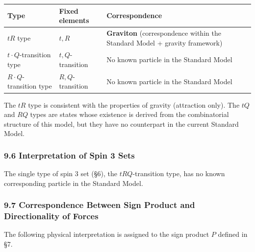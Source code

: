 \documentclass[
  a4paper,11pt]{article}
\newcounter{none}
\theoremstyle{definition}
\theoremstyle{remark}
\begin{document}
{\def\LTcaptype{none} %
\begin{longtable}[]{@{}
  >{\raggedright\arraybackslash}p{}
  >{\raggedright\arraybackslash}p{}
  >{\raggedright\arraybackslash}p{}@{}}
\toprule\noalign{}
\begin{minipage}[b]{\linewidth}\raggedright
Type
\end{minipage} & \begin{minipage}[b]{\linewidth}\raggedright
Fixed elements
\end{minipage} & \begin{minipage}[b]{\linewidth}\raggedright
Correspondence
\end{minipage} \\
\midrule\noalign{}
\endhead
\bottomrule\noalign{}
\endlastfoot
\(tR\) type & \(t, R\) & \textbf{Graviton} (correspondence within the
Standard Model + gravity framework) \\
\(t \cdot Q\)-transition type & \(t, Q\)-transition & No known particle
in the Standard Model \\
\(R \cdot Q\)-transition type & \(R, Q\)-transition & No known particle
in the Standard Model \\
\end{longtable}
}

The \(tR\) type is consistent with the properties of gravity (attraction
only). The \(tQ\) and \(RQ\) types are states whose existence is derived
from the combinatorial structure of this model, but they have no
counterpart in the current Standard Model.

\subsubsection{9.6 Interpretation of Spin 3
Sets}\label{interpretation-of-spin-3-sets}

The single type of spin 3 set (§6), the \(tRQ\)-transition type, has no
known corresponding particle in the Standard Model.

\subsubsection{9.7 Correspondence Between Sign Product and
Directionality of
Forces}\label{correspondence-between-sign-product-and-directionality-of-forces}

The following physical interpretation is assigned to the sign product
\(P\) defined in §7.
\end{document}
